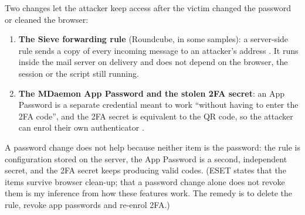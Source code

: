 \documentclass[11pt,a4paper]{article}
\begin{document}
Two changes let the attacker keep access after the victim changed the password or cleaned the browser:
\begin{enumerate}[label=(\arabic*)]
\item \textbf{The Sieve forwarding rule} (Roundcube, in some samples): a server-side rule sends a copy of every
incoming message to an attacker's address \cite{eset}. It runs inside the mail server on delivery and does not depend on
the browser, the session or the script still running.
\item \textbf{The MDaemon App Password and the stolen 2FA secret}: an App Password is a separate credential meant to
work ``without having to enter the 2FA code'', and the 2FA secret is equivalent to the QR code, so the attacker can enrol their
own authenticator \cite{eset}.
\end{enumerate}
A password change does not help because neither item is the password: the rule is configuration stored on the server, the
App Password is a second, independent secret, and the 2FA secret keeps producing valid codes. (ESET states that the items
survive browser clean-up; that a password change alone does not revoke them is my inference from how these features work.
The remedy is to delete the rule, revoke app passwords and re-enrol 2FA.)
\end{document}
